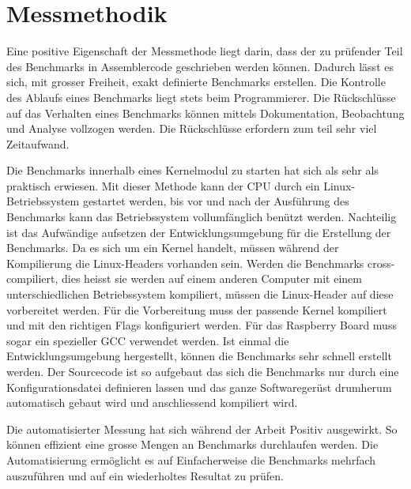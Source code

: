 \section{Messmethodik}
Eine positive Eigenschaft der Messmethode liegt darin, dass der zu prüfender Teil des Benchmarks in Assemblercode geschrieben werden können. Dadurch lässt es sich, mit grosser Freiheit, exakt definierte Benchmarks erstellen. Die Kontrolle des Ablaufs eines Benchmarks liegt stets beim Programmierer. Die Rückschlüsse auf das Verhalten eines Benchmarks können mittels Dokumentation, Beobachtung und Analyse vollzogen werden. Die Rückschlüsse erfordern zum teil sehr viel Zeitaufwand.
\par
Die Benchmarks innerhalb eines Kernelmodul zu starten hat sich als sehr als praktisch erwiesen. Mit dieser Methode kann der CPU durch ein Linux-Betriebssystem gestartet werden, bis vor und nach der Ausführung des Benchmarks kann das Betriebssystem vollumfänglich benützt werden. Nachteilig ist das Aufwändige aufsetzen der Entwicklungsumgebung für die Erstellung der Benchmarks. Da es sich um ein Kernel handelt, müssen während der Kompilierung die Linux-Headers vorhanden sein. Werden die Benchmarks cross-compiliert, dies heisst sie werden auf einem anderen Computer mit einem unterschiedlichen Betriebssystem kompiliert, müssen die Linux-Header auf diese vorbereitet werden. Für die Vorbereitung muss der passende Kernel kompiliert und mit den richtigen Flags konfiguriert werden. Für das Raspberry Board muss sogar ein spezieller GCC verwendet werden. Ist einmal die Entwicklungsumgebung hergestellt, können die Benchmarks sehr schnell erstellt werden. Der Sourcecode ist so aufgebaut das sich die Benchmarks nur durch eine Konfigurationsdatei definieren lassen und das ganze Softwaregerüst drumherum automatisch gebaut wird und anschliessend kompiliert wird.
\par
Die automatisierter Messung hat sich während der Arbeit Positiv ausgewirkt. So können effizient eine grosse Mengen an Benchmarks durchlaufen werden. Die Automatisierung ermöglicht es auf Einfacherweise die Benchmarks mehrfach auszuführen und auf ein wiederholtes Resultat zu prüfen.
\par
